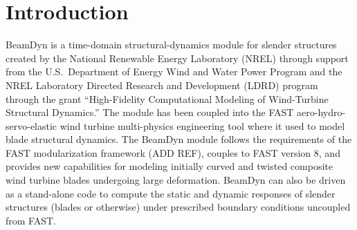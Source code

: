 \chapter{Introduction}
BeamDyn is a time-domain structural-dynamics module for slender structures created by the National Renewable Energy Laboratory (NREL) through support from the U.S.\ Department of Energy Wind and Water Power Program and the NREL Laboratory Directed Research and Development (LDRD) program through the grant ``High-Fidelity Computational Modeling of Wind-Turbine Structural Dynamics.''  
The module has been coupled into the FAST aero-hydro-servo-elastic wind turbine multi-physics engineering tool where it used to model blade structural dynamics. 
The BeamDyn module follows the requirements of the FAST modularization framework (ADD REF), couples to FAST version 8, and provides new capabilities for modeling initially curved and twisted composite wind turbine blades undergoing large deformation. 
BeamDyn can also be driven as a stand-alone code to compute the static and dynamic responses of slender structures (blades or otherwise) under prescribed boundary conditions uncoupled from FAST.

